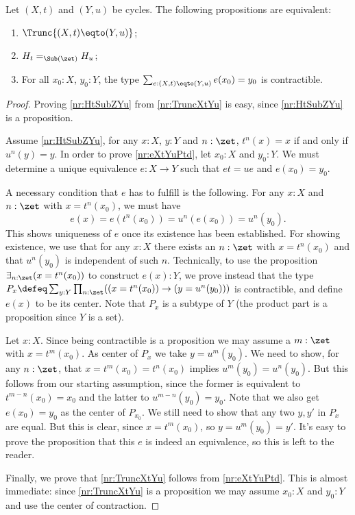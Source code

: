 \begin{lemma}\label{lem:IdCycle}
Let $(X,t)$ and $(Y,u)$ be cycles. The following propositions
are equivalent:
\begin{enumerate}
\item\label{nr:TruncXtYu} $\Trunc{(X,t)\eqto(Y,u)}$;
\item\label{nr:HtSubZYu} $H_t =_{\Sub(\zet)} H_u$;
\item\label{nr:eXtYuPtd} For all $x_0:X$, $y_0:Y$, the type
$\sum_{e:(X,t)\eqto(Y,u)} e(x_0) = y_0$ is contractible.
\end{enumerate}
\end{lemma}
\begin{proof}
  Proving \ref{nr:HtSubZYu} from \ref{nr:TruncXtYu} is easy,
  since \ref{nr:HtSubZYu} is a proposition.

  Assume \ref{nr:HtSubZYu}, \ie for any $x:X$, $y:Y$ and $n:\zet$,
  $t^n(x)=x$ if and only if $u^n(y)=y$. In order to prove \ref{nr:eXtYuPtd},
  let $x_0:X$ and $y_0:Y$. We must determine a unique equivalence
  $e:X\to Y$ such that $et=ue$ and $e(x_0)=y_0$.

  A necessary condition that $e$ has to fulfill is the following.
  For any $x:X$ and $n:\zet$ with $x=t^n(x_0)$, we must have
  \[
    e(x)=e(t^n(x_0))=u^n(e(x_0))=u^n(y_0).
  \]
  This shows uniqueness of $e$ once its existence has been established.
  For showing existence, we use that for any $x:X$ there exists an
  $n:\zet$ with $x=t^n(x_0)$ and that $u^n(y_0)$ is independent of such $n$.
  Technically, to use the proposition $\exists_{n:\zet}(x=t^n(x_0))$ to
  construct $e(x):Y$, we prove instead that the type
  $P_x\defeq\sum_{y:Y}\prod_{n:\zet}((x=t^n(x_0)) \to (y=u^n(y_0)))$
  is contractible, and define $e(x)$ to be its center.
  Note that $P_x$ is a subtype of $Y$
  (the product part is a proposition since $Y$ is a set).

  Let $x:X$. Since being contractible is a proposition we may
  assume a $m:\zet$ with $x=t^{m}(x_0)$.
  As center of $P_x$ we take $y=u^{m}(y_0)$.
  We need to show, for any $n:\zet$,
  that $x=t^m(x_0)=t^n(x_0)$ implies $u^m(y_0)=u^n(y_0)$.
  But this follows from our starting assumption, since
  the former is equivalent to $t^{m-n}(x_0)=x_0$
  and the latter to $u^{m-n}(y_0)=y_0$.
  Note that we also get $e(x_0)=y_0$ as the center of $P_{x_0}$.
  We still need to show that any two $y,y'$ in $P_x$ are equal.
  But this is clear, since $x=t^{m}(x_0)$, so $y=u^{m}(y_0)=y'$.
  It's easy to prove the proposition that this $e$ is indeed
  an equivalence, so this is left to the reader.

  Finally, we prove that \ref{nr:TruncXtYu} follows from \ref{nr:eXtYuPtd}.
  This is almost immediate: since \ref{nr:TruncXtYu} is a proposition
  we may assume $x_0:X$ and $y_0:Y$ and use the center of contraction.
\end{proof}



